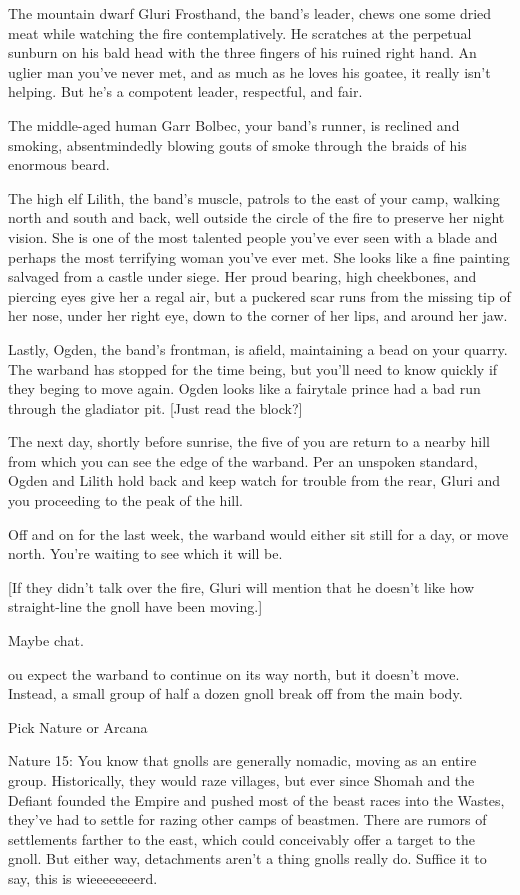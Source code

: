 \begin{multicols}{2}
The mountain dwarf Gluri Frosthand, the band's leader, chews one some dried meat while watching
  the fire contemplatively.
He scratches at the perpetual sunburn on his bald head with the three fingers of his ruined right
  hand.
An uglier man you've never met, and as much as he loves his goatee, it really isn't helping.
But he's a compotent leader, respectful, and fair.

The middle-aged human Garr Bolbec, your band's runner, is reclined and smoking, absentmindedly
  blowing gouts of smoke through the braids of his enormous beard.

The high elf Lilith, the band's muscle, patrols to the east of your camp, walking north and south
  and back, well outside the circle of the fire to preserve her night vision.
She is one of the most talented people you've ever seen with a blade and perhaps the most
  terrifying woman you've ever met.
She looks like a fine painting salvaged from a castle under siege.
Her proud bearing, high cheekbones, and piercing eyes give her a regal air, but a puckered scar
  runs from the missing tip of her nose, under her right eye, down to the corner of her lips,
  and around her jaw.

Lastly, Ogden, the band's frontman, is afield, maintaining a bead on your quarry.
The warband has stopped for the time being, but you'll need to know quickly if they beging to move
  again.
Ogden looks like a fairytale prince had a bad run through the gladiator pit.
[Just read the block?]


\hrulefill

The next day, shortly before sunrise, the five of you are return to a nearby hill from which you
  can see the edge of the warband.
Per an unspoken standard, Ogden and Lilith hold back and keep watch for trouble from the rear,
  Gluri and you proceeding to the peak of the hill.

Off and on for the last week, the warband would either sit still for a day, or move north.
You're waiting to see which it will be.

[If they didn't talk over the fire, Gluri will mention that he doesn't like how straight-line
 the gnoll have been moving.]

Maybe chat.

ou expect the warband to continue on its way north, but it doesn't move.
Instead, a small group of half a dozen gnoll break off from the main body.

Pick Nature or Arcana

Nature 15: You know that gnolls are generally nomadic, moving as an entire group.
Historically, they would raze villages, but ever since Shomah and the Defiant founded the Empire
  and pushed most of the beast races into the Wastes, they've had to settle for razing other
  camps of beastmen.
There are rumors of settlements farther to the east, which could conceivably offer a target to the gnoll.
But either way, detachments aren't a thing gnolls really do.
Suffice it to say, this is wieeeeeeeerd.



\end{multicols}
